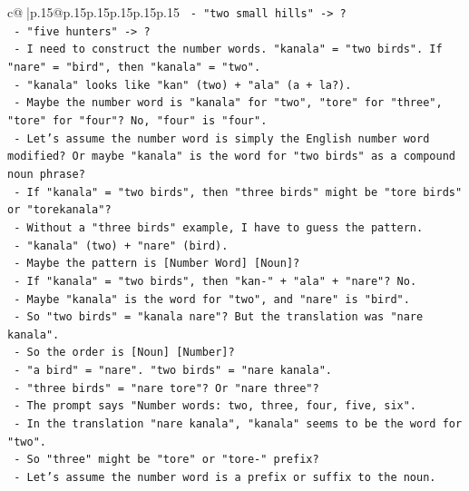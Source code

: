 \documentclass{article}
\begin{document}
{\begin{supertabular}{c@{$\;$}|p{.15\linewidth}@{}p{.15\linewidth}p{.15\linewidth}p{.15\linewidth}p{.15\linewidth}p{.15\linewidth}}
{{{\texttt{            {-} "two small hills" {-}> ?} \\
\texttt{            {-} "five hunters" {-}> ?} \\
\texttt{            {-} I need to construct the number words. "kanala" = "two birds". If "nare" = "bird", then "kanala" = "two".} \\
\texttt{            {-} "kanala" looks like "kan" (two) + "ala" (a + la?).} \\
\texttt{            {-} Maybe the number word is "kanala" for "two", "tore" for "three", "tore" for "four"? No, "four" is "four".} \\
\texttt{            {-} Let's assume the number word is simply the English number word modified? Or maybe "kanala" is the word for "two birds" as a compound noun phrase?} \\
\texttt{            {-} If "kanala" = "two birds", then "three birds" might be "tore birds" or "torekanala"?} \\
\texttt{            {-} Without a "three birds" example, I have to guess the pattern.} \\
\texttt{            {-} "kanala" (two) + "nare" (bird).} \\
\texttt{            {-} Maybe the pattern is {[}Number Word{]} {[}Noun{]}?} \\
\texttt{            {-} If "kanala" = "two birds", then "kan{-}" + "ala" + "nare"? No.} \\
\texttt{            {-} Maybe "kanala" is the word for "two", and "nare" is "bird".} \\
\texttt{            {-} So "two birds" = "kanala nare"? But the translation was "nare kanala".} \\
\texttt{            {-} So the order is {[}Noun{]} {[}Number{]}?} \\
\texttt{            {-} "a bird" = "nare". "two birds" = "nare kanala".} \\
\texttt{            {-} "three birds" = "nare tore"? Or "nare three"?} \\
\texttt{            {-} The prompt says "Number words: two, three, four, five, six".} \\
\texttt{            {-} In the translation "nare kanala", "kanala" seems to be the word for "two".} \\
\texttt{            {-} So "three" might be "tore" or "tore{-}" prefix?} \\
\texttt{            {-} Let's assume the number word is a prefix or suffix to the noun.} \\
}}}
\end{supertabular}}
\end{document}
